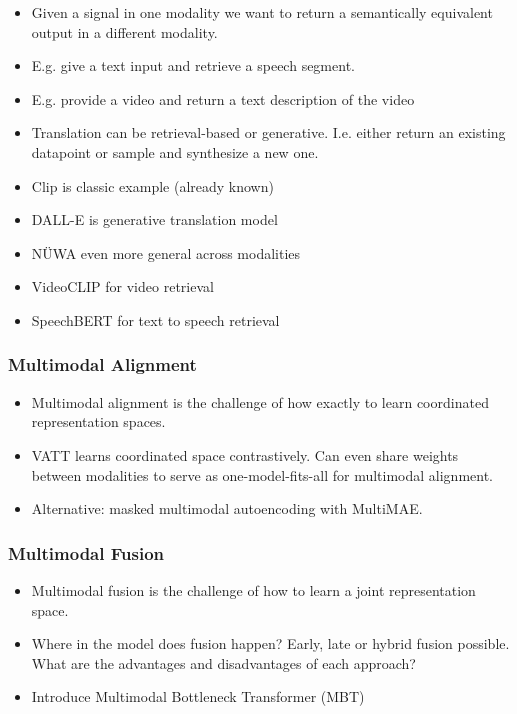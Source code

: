 \documentclass[
]{krantz}
\providecommand{\tightlist}{%
  \setlength{\itemsep}{0pt}\setlength{\parskip}{0pt}}
\begin{document}
\begin{itemize}
\tightlist
\item
  Given a signal in one modality we want to return a semantically equivalent output in a different modality.
\item
  E.g. give a text input and retrieve a speech segment.
\item
  E.g. provide a video and return a text description of the video
\item
  Translation can be retrieval-based or generative. I.e. either return an existing datapoint or sample and synthesize a new one.
\item
  Clip is classic example (already known)
\item
  DALL-E is generative translation model
\item
  NÜWA even more general across modalities
\item
  VideoCLIP for video retrieval
\item
  SpeechBERT for text to speech retrieval
\end{itemize}

\hypertarget{multimodal-alignment}{%
\subsubsection{Multimodal Alignment}\label{multimodal-alignment}}

\begin{itemize}
\tightlist
\item
  Multimodal alignment is the challenge of how exactly to learn coordinated representation spaces.
\item
  VATT learns coordinated space contrastively. Can even share weights between modalities to serve as one-model-fits-all for multimodal alignment.
\item
  Alternative: masked multimodal autoencoding with MultiMAE.
\end{itemize}

\hypertarget{multimodal-fusion}{%
\subsubsection{Multimodal Fusion}\label{multimodal-fusion}}

\begin{itemize}
\tightlist
\item
  Multimodal fusion is the challenge of how to learn a joint representation space.
\item
  Where in the model does fusion happen? Early, late or hybrid fusion possible. What are the advantages and disadvantages of each approach?
\item
  Introduce Multimodal Bottleneck Transformer (MBT)
\end{itemize}
\end{document}
